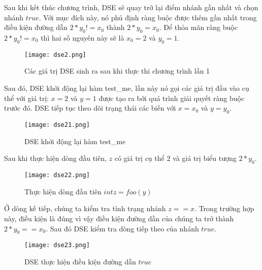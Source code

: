 Sau khi kết thúc chương trình, DSE sẽ quay trở lại điểm nhánh gần nhất và chọn nhánh $true$. Với mục đích này, nó phủ định ràng buộc được thêm gần nhất trong điều kiện đường dẫn $2*y_{0} != x_{0}$ thành $2*y_{0} = x_{0}$. Để thỏa mãn ràng buộc  $2*y_{0} != x_{0}$  thì hai số nguyên này sẽ là $x_{0} = 2$ và $ y_{0} = 1$.

\begin{center}
	\begin{figure}[H]
		\begin{center}
			\texttt{[image: dse2.png]}
		\end{center}
		\caption{Các giá trị DSE sinh ra sau khi thực thi chương trình lần 1}
		\label{dse2}
	\end{figure}
\end{center}

Sau đó, DSE khởi động lại hàm test\_me, lần này nó gọi các giá trị đầu vào cụ thể với giá trị: $x = 2$ và $y = 1$ được tạo ra bởi quá trình giải quyết ràng buộc trước đó. DSE tiếp tục theo dõi trạng thái các biến với $x = x_{0}$ và $y = y_{0}$.

\begin{center}
	\begin{figure}[H]
		\begin{center}
			\texttt{[image: dse21.png]}
		\end{center}
		\caption{DSE khởi động lại hàm test\_me}
		\label{dse21}
	\end{figure}
\end{center}

Sau khi thực hiện dòng đầu tiên, $z$ có giá trị cụ thể $2$ và giá trị biểu tượng $2*y_{0}$.

\begin{center}
	\begin{figure}[H]
		\begin{center}
			\texttt{[image: dse22.png]}
		\end{center}
		\caption{Thực hiện dòng đầu tiên $int z = foo(y)$}
		\label{dse22}
	\end{figure}
\end{center}

Ở dòng kế tiếp, chúng ta kiểm tra tình trạng nhánh $z == x$. Trong trường hợp này, điều kiện là đúng vì vậy điều kiện đường dẫn của chúng ta trở thành $2*y_{0} == x_{0}$. Sau đó DSE kiểm tra dòng tiếp theo của nhánh $true$.

\begin{center}
	\begin{figure}[H]
		\begin{center}
			\texttt{[image: dse23.png]}
		\end{center}
		\caption{DSE thực hiện điều kiện đường dẫn $true$}
		\label{dse23}
	\end{figure}
\end{center} 

